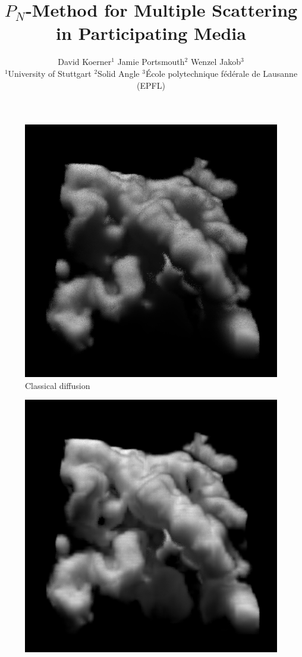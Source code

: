 \documentclass{egpubl}
\title%
{
$P_N$-Method for Multiple Scattering in Participating Media
}
\author[D. Koerner \& J. Portsmouth \& W. Jakob]
{
David Koerner$^{1}$
\qquad Jamie Portsmouth$^{2}$
\qquad Wenzel Jakob$^{3}$
\\
$^1$University of Stuttgart
\qquad $^2$Solid Angle
\qquad $^3$\'{E}cole polytechnique f\'{e}d\'{e}rale de Lausanne (EPFL)
}
\begin{document}
\teaser
{
\centering
\begin{subfigure}{0.24\linewidth}
\includegraphics[width=\linewidth]{nebulae_ms_cda.png}
\vspace{-0.17in}
\caption{Classical diffusion}
\label{fig:teaser_cda}
\end{subfigure}%
\hspace{0.002\linewidth}
\begin{subfigure}{0.24\linewidth}
\includegraphics[width=\linewidth]{nebulae_ms_p5.png}

\end{subfigure}}
\end{document}
